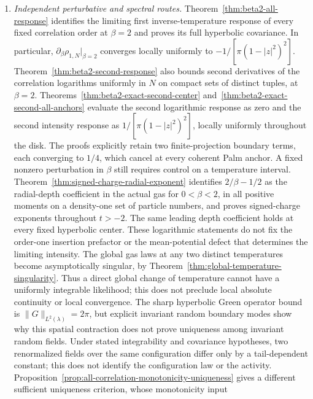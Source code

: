 \documentclass[11pt,a4paper]{article}
\numberwithin{equation}{section}
\theoremstyle{definition}
\theoremstyle{remark}
\begin{document}
\begin{enumerate}
mean defect and Palm dipole identities isolate the remaining expectations
without assuming this symmetry. The Gaussian-free
canonical kernels have an affine isometry covariance, which is distinct
from invariance of the selected augmented law.
\item \emph{Independent perturbative and spectral routes.}
Theorem~\ref{thm:beta2-all-response} identifies the limiting first
inverse-temperature response of every fixed correlation order at
$\beta=2$ and proves its full hyperbolic covariance. In particular,
$\partial_\beta\rho_{1,N}|_{\beta=2}$ converges locally uniformly to
$-1/[\pi(1-|z|^2)^2]$.
Theorem~\ref{thm:beta2-second-response} also bounds second derivatives
of the correlation logarithms uniformly in $N$ on compact sets of
distinct tuples, at $\beta=2$.
Theorems~\ref{thm:beta2-exact-second-center}
and~\ref{thm:beta2-exact-second-all-anchors} evaluate the second
logarithmic response as zero and the second intensity response as
$1/[\pi(1-|z|^2)^2]$, locally uniformly throughout the disk. The proofs
explicitly retain two finite-projection boundary terms, each converging
to $1/4$, which cancel at every coherent Palm anchor. A fixed nonzero perturbation
in $\beta$ still requires control on a temperature interval.
Theorem~\ref{thm:signed-charge-radial-exponent} identifies
$2/\beta-1/2$ as the radial-depth coefficient in the actual gas for
$0<\beta<2$, in all positive moments on a density-one set of particle
numbers, and proves signed-charge exponents throughout $t>-2$.
The same leading depth coefficient holds at every fixed hyperbolic center.
These logarithmic statements do not fix the order-one insertion prefactor
or the mean-potential defect that determines the limiting intensity. The global gas laws at any two
distinct temperatures become asymptotically singular, by
Theorem~\ref{thm:global-temperature-singularity}. Thus a direct global
change of temperature cannot have a uniformly integrable likelihood;
this does not preclude local absolute continuity or local convergence.
The sharp hyperbolic Green
operator bound is $\|G\|_{L^2(\lambda)}=2\pi$, but explicit invariant
random boundary modes show why this spatial contraction does not
prove uniqueness among invariant random fields. Under stated
integrability and covariance hypotheses, two renormalized fields over
the same configuration differ only by a tail-dependent constant; this
does not identify the configuration law or the activity.
Proposition~\ref{prop:all-correlation-monotonicity-uniqueness} gives a
different sufficient uniqueness criterion, whose monotonicity input

\end{enumerate}
\end{document}
